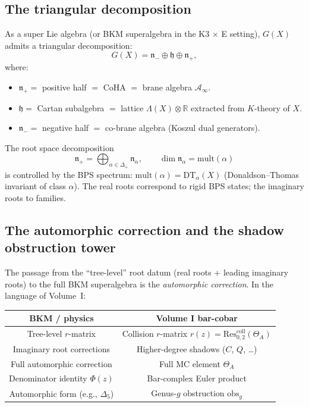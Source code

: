 \documentclass[11pt]{article}
\theoremstyle{definition}
\theoremstyle{remark}
\newcommand{\cA}{\mathcal{A}}
\begin{document}
\subsection{The triangular decomposition}

As a super Lie algebra (or BKM superalgebra in the K3 $\times$ E setting),
$G(X)$ admits a triangular decomposition:
\[
 G(X) = \mathfrak{n}_- \oplus \mathfrak{h} \oplus \mathfrak{n}_+,
\]
where:
\begin{itemize}
 \item $\mathfrak{n}_+ = $ positive half $=$ CoHA $=$ brane algebra
 $\cA_\infty$.
 \item $\mathfrak{h} = $ Cartan subalgebra $=$ lattice $\Lambda(X) \otimes
 \mathbb{R}$ extracted from $K$-theory of $X$.
 \item $\mathfrak{n}_- = $ negative half $=$ co-brane algebra (Koszul dual
 generators).
\end{itemize}
The root space decomposition
\[
 \mathfrak{n}_+ = \bigoplus_{\alpha \in \Delta_+}
 \mathfrak{n}_\alpha, \qquad
 \dim \mathfrak{n}_\alpha = \mathrm{mult}(\alpha)
\]
is controlled by the BPS spectrum: $\mathrm{mult}(\alpha) = \mathrm{DT}_\alpha(X)$
(Donaldson--Thomas invariant of class $\alpha$). The real roots correspond to
rigid BPS states; the imaginary roots to families.

\subsection{The automorphic correction and the shadow obstruction tower}
\label{sec:automorphic-shadow}

The passage from the ``tree-level'' root datum (real roots + leading imaginary
roots) to the full BKM superalgebra is the \emph{automorphic correction}. In
the language of Volume~I:

\begin{center}
\renewcommand{\arraystretch}{1.4}
\begin{tabular}{|c|c|}
\hline
\textbf{BKM / physics} & \textbf{Volume I bar-cobar} \\
\hline
Tree-level $r$-matrix & Collision $r$-matrix
 $r(z) = \mathrm{Res}^{\mathrm{coll}}_{0,2}(\Theta_A)$ \\
\hline
Imaginary root corrections & Higher-degree shadows
 ($C$, $Q$, \ldots) \\
\hline
Full automorphic correction & Full MC element $\Theta_A$ \\
\hline
Denominator identity $\Phi(z)$ & Bar-complex Euler product \\
\hline
Automorphic form (e.g., $\Delta_5$) & Genus-$g$ obstruction $\mathrm{obs}_g$ \\
\hline
\end{tabular}
\end{center}
\end{document}
